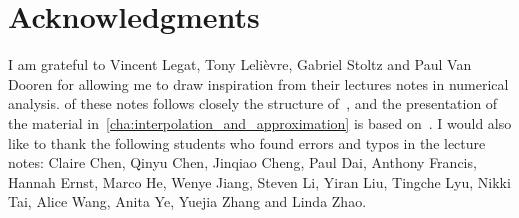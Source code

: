 \chapter*{Acknowledgments}%
\label{cha:acknowledgements}

I am grateful to Vincent Legat, Tony Lelièvre, Gabriel Stoltz and Paul Van Dooren for allowing me to draw inspiration from their lectures notes in numerical analysis.
 of these notes follows closely the structure of~\cite[Chapter 3]{VanDooren},
and the presentation of the material in~\cref{cha:interpolation_and_approximation} is based on~\cite{Legat}.
I would also like to thank the following students who found errors and typos in the lecture notes:
Claire Chen, Qinyu Chen, Jinqiao Cheng, Paul Dai, Anthony Francis, Hannah Ernst, Marco He, Wenye Jiang, Steven Li, Yiran Liu, Tingche Lyu, Nikki Tai, Alice Wang, Anita Ye, Yuejia Zhang and Linda Zhao.
